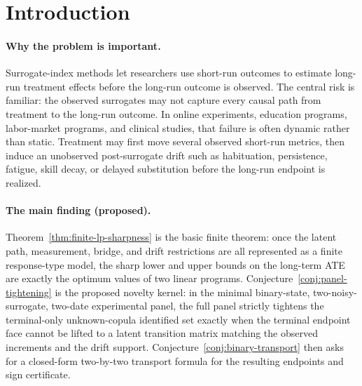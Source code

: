 \documentclass[11pt]{article}
\theoremstyle{definition}
\theoremstyle{plain}
\theoremstyle{remark}
\begin{document}
\section{Introduction}
\paragraph{Why the problem is important.}
Surrogate-index methods let researchers use short-run outcomes to estimate long-run treatment effects before the long-run outcome is observed.  The central risk is familiar: the observed surrogates may not capture every causal path from treatment to the long-run outcome.  In online experiments, education programs, labor-market programs, and clinical studies, that failure is often dynamic rather than static.  Treatment may first move several observed short-run metrics, then induce an unobserved post-surrogate drift such as habituation, persistence, fatigue, skill decay, or delayed substitution before the long-run endpoint is realized.

\paragraph{The main finding (proposed).}
Theorem~\ref{thm:finite-lp-sharpness} is the basic finite theorem: once the latent path, measurement, bridge, and drift restrictions are all represented as a finite response-type model, the sharp lower and upper bounds on the long-term ATE are exactly the optimum values of two linear programs.  Conjecture~\ref{conj:panel-tightening} is the proposed novelty kernel: in the minimal binary-state, two-noisy-surrogate, two-date experimental panel, the full panel strictly tightens the terminal-only unknown-copula identified set exactly when the terminal endpoint face cannot be lifted to a latent transition matrix matching the observed increments and the drift support.  Conjecture~\ref{conj:binary-transport} then asks for a closed-form two-by-two transport formula for the resulting endpoints and sign certificate.
\end{document}
